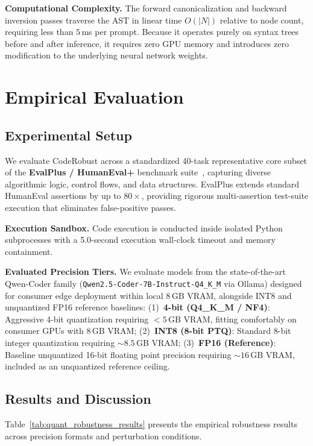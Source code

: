 \documentclass[11pt,twocolumn]{article}
\begin{document}
\noindent\textbf{Computational Complexity.} The forward canonicalization and backward inversion passes traverse the AST in linear time $O(|N|)$ relative to node count, requiring less than $5$\,ms per prompt. Because it operates purely on syntax trees before and after inference, it requires zero GPU memory and introduces zero modification to the underlying neural network weights.



\section{Empirical Evaluation}
\label{sec:evaluation}

\subsection{Experimental Setup}
We evaluate CodeRobust across a standardized 40-task representative core subset of the \textbf{EvalPlus / HumanEval+} benchmark suite~\cite{liu2024your}, capturing diverse algorithmic logic, control flows, and data structures. EvalPlus extends standard HumanEval assertions by up to $80\times$, providing rigorous multi-assertion test-suite execution that eliminates false-positive passes.

\noindent\textbf{Execution Sandbox.} Code execution is conducted inside isolated Python subprocesses with a 5.0-second execution wall-clock timeout and memory containment. 

\noindent\textbf{Evaluated Precision Tiers.} We evaluate models from the state-of-the-art Qwen-Coder family (\texttt{Qwen2.5-Coder-7B-Instruct-Q4\_K\_M} via Ollama) designed for consumer edge deployment within local 8\,GB VRAM, alongside INT8 and unquantized FP16 reference baselines: (1)~\textbf{4-bit (Q4\_K\_M / NF4)}: Aggressive 4-bit quantization requiring $< 5$\,GB VRAM, fitting comfortably on consumer GPUs with 8\,GB VRAM; (2)~\textbf{INT8 (8-bit PTQ)}: Standard 8-bit integer quantization requiring $\sim 8.5$\,GB VRAM; (3)~\textbf{FP16 (Reference)}: Baseline unquantized 16-bit floating point precision requiring $\sim 16$\,GB VRAM, included as an unquantized reference ceiling.

\subsection{Results and Discussion}
Table~\ref{tab:quant_robustness_results} presents the empirical robustness results across precision formats and perturbation conditions.
\end{document}
